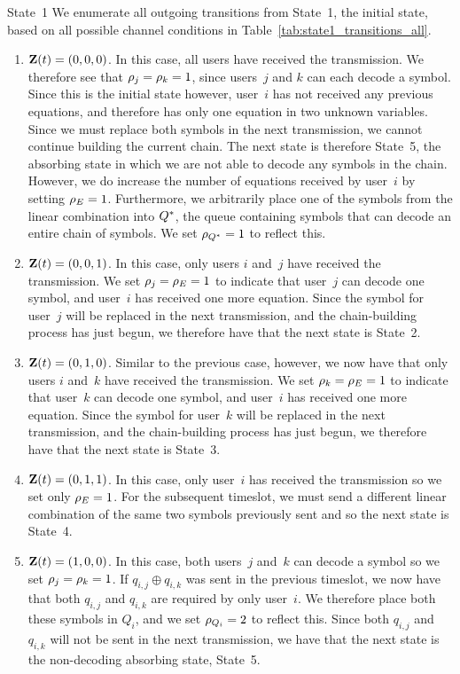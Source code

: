 
\begin{LaTeXdescription}
	\item[State~1] We enumerate all outgoing transitions from State~1, the initial state, based on all possible channel conditions in Table~\ref{tab:state1_transitions_all}.  
	\begin{enumerate}
		\item $\mathbf{Z}(t) = (0, 0, 0)$.  In this case, all users have received the transmission.  We therefore see that $\rho_{j} = \rho_{k} = 1$, since users~$j$ and $k$ can each decode a symbol.  Since this is the initial state however, user~$i$ has not received any previous equations, and therefore has only one equation in two unknown variables.  Since we must replace both symbols in the next transmission, we cannot continue building the current chain.  The next state is therefore State~5, the absorbing state in which we are not able to decode any symbols in the chain.  However, we do increase the number of equations received by user~$i$ by setting $\rho_{E} = 1$.  Furthermore, we arbitrarily place one of the symbols from the linear combination into $Q^{*}$, the queue containing symbols that can decode an entire chain of symbols.  We set $\rho_{Q^{*}} = 1$ to reflect this.  
		\item $\mathbf{Z}(t) = (0, 0, 1)$. In this case, only users $i$ and~$j$ have received the transmission.  We set $\rho_{j} =  \rho_{E} =1$ to indicate that user~$j$ can decode one symbol, and user~$i$ has received one more equation.  Since the symbol for user~$j$ will be replaced in the next transmission, and the chain-building process has just begun, we therefore have that the next state is State~2.  
		\item $\mathbf{Z}(t) = (0, 1, 0)$. Similar to the previous case, however, we now have that only users $i$ and~$k$ have received the transmission.  We set $\rho_{k} =  \rho_{E} =1$ to indicate that user~$k$ can decode one symbol, and user~$i$ has received one more equation.  Since the symbol for user~$k$ will be replaced in the next transmission, and the chain-building process has just begun, we therefore have that the next state is State~3.  
		\item $\mathbf{Z}(t) = (0, 1, 1)$.  In this case, only user~$i$ has received the transmission so we set only $\rho_{E} =1$.  For the subsequent timeslot, we must send a different linear combination of the same two symbols previously sent and so the next state is State~4.
		\item $\mathbf{Z}(t) = (1, 0, 0)$.  In this case, both users~$j$ and~$k$ can decode a symbol so we set $\rho_{j} = \rho_{k} =1$.  If $q_{i, j} \oplus q_{i, k}$ was sent in the previous timeslot, we now have that both $q_{i, j}$ and $q_{i, k}$ are required by only user~$i$.  We therefore place both these symbols in $Q_{i}$, and we set $\rho_{Q_{i}} = 2$ to reflect this.  Since both $q_{i, j}$ and $q_{i, k}$ will not be sent in the next transmission, we  have that the next state is the non-decoding absorbing state, State~5.

\end{enumerate}
\end{LaTeXdescription}
